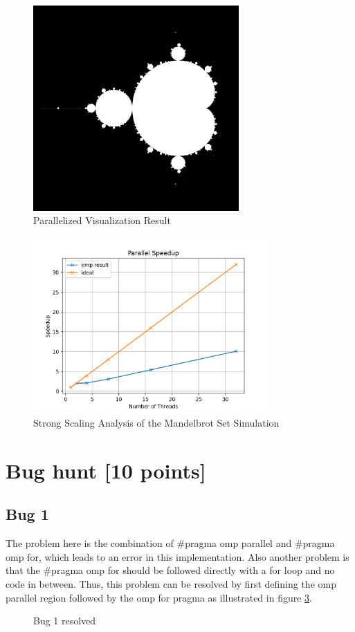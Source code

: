 \documentclass[unicode,11pt,a4paper,oneside,numbers=endperiod,openany]{scrartcl}
\begin{document}
\begin{figure}[H]
  \centering
  \includegraphics[width=0.7\textwidth]{Images_Output/mandel.png}
  \caption{Parallelized Visualization Result}
  \label{fig:mandel}
\end{figure}
\begin{figure}[H]
  \centering
  \includegraphics[width=0.8\textwidth]{Images_Output/mandel_speedup.png}
  \caption{Strong Scaling Analysis of the Mandelbrot Set Simulation}
  \label{fig:s_mandel}
\end{figure}

\section{Bug hunt [10 points]}
\subsection{Bug 1}
\indent
The problem here is the combination of \#pragma omp parallel and \#pragma omp for, which leads to an error in this implementation.
Also another problem is that the \#pragma omp for should be followed directly with a for loop and no code in between. Thus, this 
problem can be resolved by first defining the omp parallel region followed by the omp for pragma as illustrated in figure \ref{fig:bug_1}.
\begin{figure}[H]
  \centering
  {\fontsize{8}{10}\selectfont
  }
  \caption{Bug 1 resolved}
  \label{fig:bug_1}
\end{figure}
\end{document}
